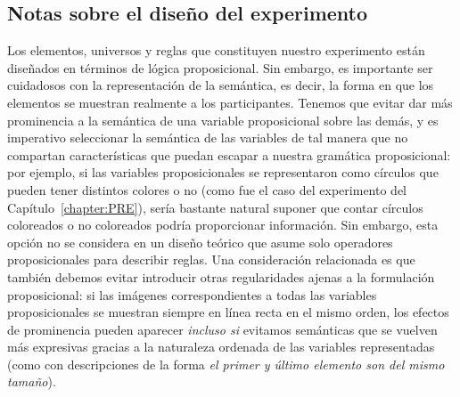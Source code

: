\subsection{Notas sobre el diseño del experimento}\label{Experiment_design}


Los elementos, universos y reglas que constituyen nuestro experimento están diseñados en términos de lógica proposicional. Sin embargo, es importante ser cuidadosos con la representación de la semántica, es decir, la forma en que los elementos se muestran realmente a los participantes. Tenemos que evitar dar más prominencia a la semántica de una variable proposicional sobre las demás, y es imperativo seleccionar la semántica de las variables de tal manera que no compartan características que puedan escapar a nuestra gramática proposicional: por ejemplo, si las variables proposicionales se representaron como círculos que pueden tener distintos colores o no (como fue el caso del experimento del Capítulo~\ref{chapter:PRE}), sería bastante natural suponer que contar círculos coloreados o no coloreados podría proporcionar información. Sin embargo, esta opción no se considera en un diseño teórico que asume solo operadores proposicionales para describir reglas. Una consideración relacionada es que también debemos evitar introducir otras regularidades ajenas a la formulación proposicional: si las imágenes correspondientes a todas las variables proposicionales se muestran siempre en línea recta en el mismo orden, los efectos de prominencia pueden aparecer \textit{incluso si} evitamos semánticas que se vuelven más expresivas gracias a la naturaleza ordenada de las variables representadas (como con descripciones de la forma \textit{el primer y último elemento son del mismo tamaño}).


